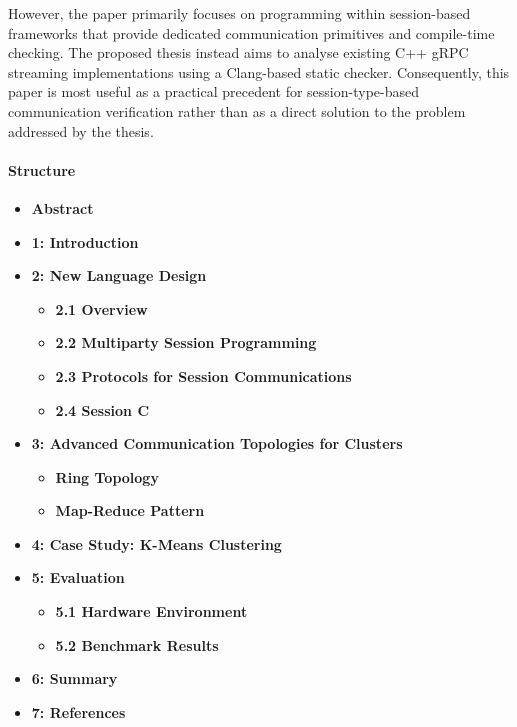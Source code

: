 However, the paper primarily focuses on programming within session-based frameworks that provide dedicated communication primitives and compile-time checking. The proposed thesis instead aims to analyse existing C++ gRPC streaming implementations using a Clang-based static checker. Consequently, this paper is most useful as a practical precedent for session-type-based communication verification rather than as a direct solution to the problem addressed by the thesis.

\paragraph{Structure}
\begin{itemize}
    \item \textbf{Abstract}

    \item \textbf{1: Introduction}

    \item \textbf{2: New Language Design}
    \begin{itemize}
        \item \textbf{2.1 Overview}
        \item \textbf{2.2 Multiparty Session Programming}
        \item \textbf{2.3 Protocols for Session Communications}
        \item \textbf{2.4 Session C}
    \end{itemize}

    \item \textbf{3: Advanced Communication Topologies for Clusters}
    \begin{itemize}
        \item \textbf{Ring Topology}
        \item \textbf{Map-Reduce Pattern}
    \end{itemize}

    \item \textbf{4: Case Study: K-Means Clustering}

    \item \textbf{5: Evaluation}
    \begin{itemize}
        \item \textbf{5.1 Hardware Environment}
        \item \textbf{5.2 Benchmark Results}
    \end{itemize}

    \item \textbf{6: Summary}

    \item \textbf{7: References}
\end{itemize}

